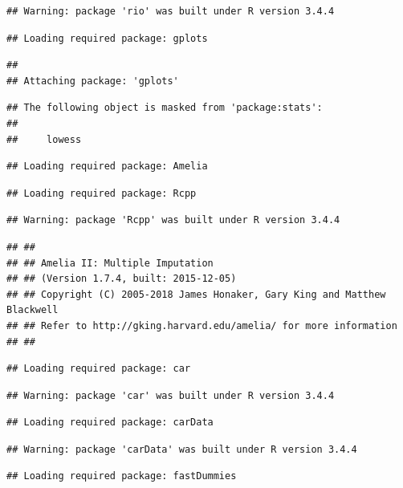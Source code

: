 \documentclass[11pt,]{article}
\begin{document}
\begin{verbatim}
## Warning: package 'rio' was built under R version 3.4.4
\end{verbatim}

\begin{verbatim}
## Loading required package: gplots
\end{verbatim}

\begin{verbatim}
## 
## Attaching package: 'gplots'
\end{verbatim}

\begin{verbatim}
## The following object is masked from 'package:stats':
## 
##     lowess
\end{verbatim}

\begin{verbatim}
## Loading required package: Amelia
\end{verbatim}

\begin{verbatim}
## Loading required package: Rcpp
\end{verbatim}

\begin{verbatim}
## Warning: package 'Rcpp' was built under R version 3.4.4
\end{verbatim}

\begin{verbatim}
## ## 
## ## Amelia II: Multiple Imputation
## ## (Version 1.7.4, built: 2015-12-05)
## ## Copyright (C) 2005-2018 James Honaker, Gary King and Matthew Blackwell
## ## Refer to http://gking.harvard.edu/amelia/ for more information
## ##
\end{verbatim}

\begin{verbatim}
## Loading required package: car
\end{verbatim}

\begin{verbatim}
## Warning: package 'car' was built under R version 3.4.4
\end{verbatim}

\begin{verbatim}
## Loading required package: carData
\end{verbatim}

\begin{verbatim}
## Warning: package 'carData' was built under R version 3.4.4
\end{verbatim}

\begin{verbatim}
## Loading required package: fastDummies
\end{verbatim}
\end{document}

